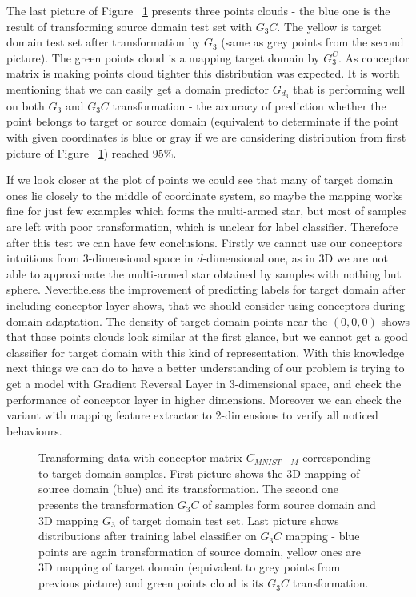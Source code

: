 \documentclass{article}
\begin{document}
\par
The last picture of Figure ~\ref{fig:ConceptorMnist} presents three points clouds - the blue one is the result of transforming source domain test set with $G_{3}C$. The yellow is target domain test set after transformation by $G_{3}$ (same as grey points from the second picture). The green points cloud is a mapping target domain by $G_{3}^{C}$. As conceptor matrix is making points cloud tighter this distribution was expected. It is worth mentioning that we can easily get a domain predictor $G_{d_{3}}$ that is performing well on both $G_{3}$ and $G_{3}C$ transformation - the accuracy of prediction whether the point belongs to target or source domain (equivalent to determinate if the point with given coordinates is blue or gray if we are considering distribution from first picture of Figure ~\ref{fig:ConceptorMnist}) reached 95\%.
\par
If we look closer at the plot of points we could see that many of target domain ones lie closely to the middle of coordinate system, so maybe the mapping works fine for just few examples which forms the multi-armed star, but most of samples are left with poor transformation, which is unclear for label classifier. Therefore after this test we can have few conclusions. Firstly we cannot use our conceptors intuitions from 3-dimensional space in $d$-dimensional one, as in 3D we are not able to approximate the multi-armed star obtained by samples with nothing but sphere. Nevertheless the improvement of predicting labels for target domain after including conceptor layer shows, that we should consider using conceptors during domain adaptation. The density of target domain points near the $(0,0,0)$ shows that those points clouds look similar at the first glance, but we cannot get a good classifier for target domain with this kind of representation. With this knowledge next things we can do to have a better understanding of our problem is trying to get a model with Gradient Reversal Layer in 3-dimensional space, and check the performance of conceptor layer in higher dimensions. Moreover we can check the variant with mapping feature extractor to 2-dimensions to verify all noticed behaviours. 

\begin{figure}[htb]%
\captionsetup[subfigure]{labelformat=empty}
    \centering
    \qquad
    \qquad
    \caption{Transforming data with conceptor matrix $C_{MNIST-M}$ corresponding to target domain samples. First picture shows the 3D mapping of source domain (blue) and its transformation. The second one presents the transformation $G_{3}C$ of samples form source domain and 3D mapping $G_{3}$ of target domain test set. Last picture shows distributions after training label classifier on $G_{3}C$ mapping - blue points are again transformation of source domain, yellow ones are 3D mapping of target domain (equivalent to grey points from previous picture) and green points cloud is its $G_{3}C$ transformation.}%
    \label{fig:ConceptorMnist}%
\end{figure}
\end{document}
